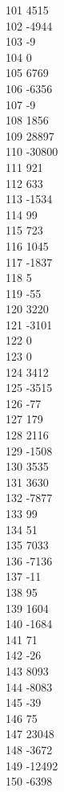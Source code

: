 { 101	4515 \\
 102	-4944 \\
 103	-9 \\
 104	0 \\
 105	6769 \\
 106	-6356 \\
 107	-9 \\
 108	1856 \\
 109	28897 \\
 110	-30800 \\
 111	921 \\
 112	633 \\
 113	-1534 \\
 114	99 \\
 115	723 \\
 116	1045 \\
 117	-1837 \\
 118	5 \\
 119	-55 \\
 120	3220 \\
 121	-3101 \\
 122	0 \\
 123	0 \\
 124	3412 \\
 125	-3515 \\
 126	-77 \\
 127	179 \\
 128	2116 \\
 129	-1508 \\
 130	3535 \\
 131	3630 \\
 132	-7877 \\
 133	99 \\
 134	51 \\
 135	7033 \\
 136	-7136 \\
 137	-11 \\
 138	95 \\
 139	1604 \\
 140	-1684 \\
 141	71 \\
 142	-26 \\
 143	8093 \\
 144	-8083 \\
 145	-39 \\
 146	75 \\
 147	23048 \\
 148	-3672 \\
 149	-12492 \\
 150	-6398 \\
}
